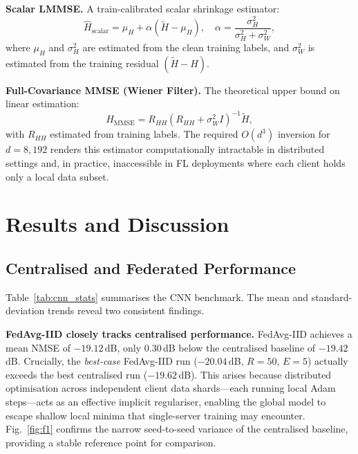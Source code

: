 \documentclass[runningheads]{llncs}
\begin{document}
\textbf{Scalar LMMSE.} A train-calibrated scalar shrinkage estimator:
\begin{equation}
  \hat{H}_\mathrm{scalar}
    = \mu_H + \alpha\!\left(\tilde{H} - \mu_H\right), \quad
  \alpha = \frac{\sigma_H^2}{\sigma_H^2 + \sigma_W^2},
  \label{eq:slmmse}
\end{equation}
where $\mu_H$ and $\sigma_H^2$ are estimated from the clean training
labels, and $\sigma_W^2$ is estimated from the training residual
$(\tilde{H} - H)$.

\textbf{Full-Covariance MMSE (Wiener Filter).} The theoretical upper
bound on linear estimation:
\begin{equation}
  \hat{H}_\mathrm{MMSE}
    = R_{HH}\!\left(R_{HH} + \sigma_W^2 I\right)^{-1}\!\tilde{H},
  \label{eq:mmse}
\end{equation}
with $R_{HH}$ estimated from training labels.  The required
$O(d^3)$ inversion for $d = 8{,}192$ renders this estimator
computationally intractable in distributed settings and, in practice,
inaccessible in FL deployments where each client holds only a local data
subset.

\section{Results and Discussion}
\label{sec:results}

\subsection{Centralised and Federated Performance}
\label{ssec:perf}

Table~\ref{tab:cnn_stats} summarises the CNN benchmark.  The mean and
standard-deviation trends reveal two consistent findings.

\textbf{FedAvg-IID closely tracks centralised performance.}
FedAvg-IID achieves a mean NMSE of $-19.12$\,dB, only $0.30$\,dB below
the centralised baseline of $-19.42$\,dB.  Crucially, the
\emph{best-case} FedAvg-IID run ($-20.04$\,dB, $R=50$, $E=5$) actually
exceeds the best centralised run ($-19.62$\,dB).  This arises because
distributed optimisation across independent client data shards---each
running local Adam steps---acts as an effective implicit regulariser,
enabling the global model to escape shallow local minima that
single-server training may encounter.  Fig.~\ref{fig:f1} confirms the
narrow seed-to-seed variance of the centralised baseline, providing a
stable reference point for comparison.
\end{document}
